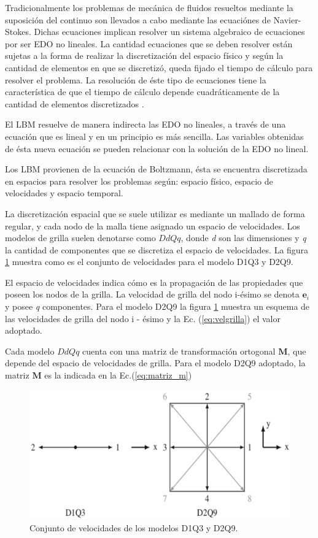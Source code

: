 Tradicionalmente los problemas de mecánica de fluidos resueltos mediante la suposición del continuo son llevados a cabo mediante las ecuaciónes de Navier-Stokes. Dichas ecuaciones implican resolver un sistema algebraico de ecuaciones por ser EDO no lineales. La cantidad ecuaciones que se deben resolver están sujetas a la forma de realizar la discretización del 
espacio físico y según la  cantidad de elementos en que se discretizó, queda fijado el tiempo de cálculo para resolver el problema. La resolución de éste tipo de ecuaciones tiene la característica de que el tiempo de cálculo depende cuadráticamente de la cantidad de elementos discretizados \cite{kelley1995iterative}.

El LBM resuelve de manera indirecta las EDO no lineales, a través de una ecuación que es lineal y en un principio es más sencilla. Las variables obtenidas de ésta nueva ecuación se pueden relacionar con la solución de la EDO no lineal.

Los LBM provienen de la ecuación de Boltzmann, ésta se encuentra discretizada en espacios para resolver los problemas según: espacio físico, espacio de velocidades y espacio temporal. 

La discretización espacial que se suele utilizar es mediante un mallado de forma regular\cite{guo2013lattice}, y  cada nodo de la malla tiene asignado un espacio de velocidades. Los modelos de grilla suelen denotarse como $DdQq$, donde \textit{d} son las dimensiones y \textit{q} la cantidad de componentes que se discretiza el espacio de velocidades. La figura \ref{fig:D1Q3_D2Q9} muestra como es el conjunto de velocidades para el modelo D1Q3 y D2Q9.

El espacio de velocidades indica cómo es la propagación de las propiedades que poseen los nodos de la grilla. La velocidad de grilla del nodo i-ésimo se denota $\mathbf{e}_{i}$ y posee \textit{q} componentes. Para el modelo D2Q9 la figura \ref{fig:D1Q3_D2Q9} muestra un esquema de las velocidades de grilla del nodo i - ésimo y la Ec. (\ref{eq:velgrilla}) el valor adoptado. 

Cada modelo $DdQq$ cuenta con una matriz de transformación ortogonal $\mathbf{M}$, que depende del espacio de velocidades de grilla. Para el modelo D2Q9 adoptado, la matriz $\mathbf{M}$ es la indicada en la Ec.(\ref{eq:matriz_m})

\begin{figure}[h!]
	\centering
	\includegraphics[width=.8\textwidth]{figs/cap1/D1Q3_D2Q9}
	\caption{Conjunto de velocidades de los modelos D1Q3 y D2Q9. \cite{kruger2017lattice}}
	\label{fig:D1Q3_D2Q9}	
\end{figure}



